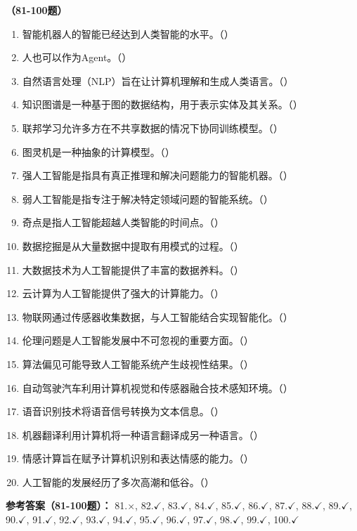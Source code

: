 \vspace{1em}
\textbf{（81-100题）}
\begin{enumerate}[resume,leftmargin=2em,itemsep=1pt]
\item 智能机器人的智能已经达到人类智能的水平。（\quad）
\item 人也可以作为Agent。（\quad）
\item 自然语言处理（NLP）旨在让计算机理解和生成人类语言。（\quad）
\item 知识图谱是一种基于图的数据结构，用于表示实体及其关系。（\quad）
\item 联邦学习允许多方在不共享数据的情况下协同训练模型。（\quad）
\item 图灵机是一种抽象的计算模型。（\quad）
\item 强人工智能是指具有真正推理和解决问题能力的智能机器。（\quad）
\item 弱人工智能是指专注于解决特定领域问题的智能系统。（\quad）
\item 奇点是指人工智能超越人类智能的时间点。（\quad）
\item 数据挖掘是从大量数据中提取有用模式的过程。（\quad）
\item 大数据技术为人工智能提供了丰富的数据养料。（\quad）
\item 云计算为人工智能提供了强大的计算能力。（\quad）
\item 物联网通过传感器收集数据，与人工智能结合实现智能化。（\quad）
\item 伦理问题是人工智能发展中不可忽视的重要方面。（\quad）
\item 算法偏见可能导致人工智能系统产生歧视性结果。（\quad）
\item 自动驾驶汽车利用计算机视觉和传感器融合技术感知环境。（\quad）
\item 语音识别技术将语音信号转换为文本信息。（\quad）
\item 机器翻译利用计算机将一种语言翻译成另一种语言。（\quad）
\item 情感计算旨在赋予计算机识别和表达情感的能力。（\quad）
\item 人工智能的发展经历了多次高潮和低谷。（\quad）
\end{enumerate}

\textbf{参考答案（81-100题）：}
81.$\times$, 82.$\checkmark$, 83.$\checkmark$, 84.$\checkmark$, 85.$\checkmark$, 86.$\checkmark$, 87.$\checkmark$, 88.$\checkmark$, 89.$\checkmark$, 90.$\checkmark$, 
91.$\checkmark$, 92.$\checkmark$, 93.$\checkmark$, 94.$\checkmark$, 95.$\checkmark$, 96.$\checkmark$, 97.$\checkmark$, 98.$\checkmark$, 99.$\checkmark$, 100.$\checkmark$

